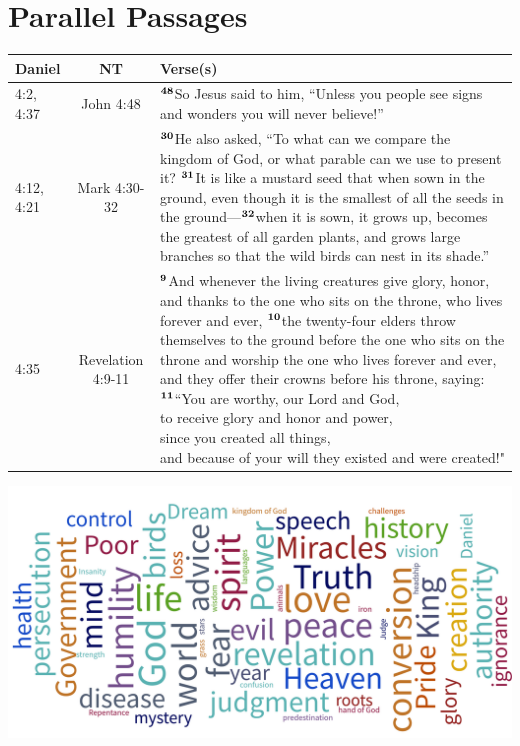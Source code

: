 \documentclass[12pt,a4paper,final]{article}
\renewcommand{\textsuperscript}[1]{\ensuremath{^{\textbf{\scriptsize #1}}}}
\begin{document}
\newpage
\section*{Parallel Passages}
\begin{tabularx}{\linewidth}{lcX}
\hline 
\textbf{Daniel} & \textbf{NT} & \textbf{Verse(s)} \\ 
\hline 
4:2, 4:37 & John 4:48 & \textsuperscript{48}So Jesus said to him, “Unless you people see signs and wonders you will never believe!” \\ 
\hline 
4:12, 4:21 & Mark 4:30-32 & \textsuperscript{30}He also asked, “To what can we compare the kingdom of God, or what parable can we use to present it? \textsuperscript{31}It is like a mustard seed that when sown in the ground, even though it is the smallest of all the seeds in the ground—\textsuperscript{32}when it is sown, it grows up, becomes the greatest of all garden plants, and grows large branches so that the wild birds can nest in its shade.”  \\ 
\hline 
4:35 & Revelation 4:9-11 & \makecell[Xt]{\textsuperscript{9}And whenever the living creatures give glory, honor, and thanks to the one who sits on the throne, who lives forever and ever, \textsuperscript{10}the twenty-four elders throw themselves to the ground before the one who sits on the throne and worship the one who lives forever and ever, and they offer their crowns before his throne, saying: \\
    \textsuperscript{11}“You are worthy, our Lord and God, \\
    to receive glory and honor and power, \\
    since you created all things, \\
    and because of your will they existed and were created!" \\ 
}\\
\hline 
\end{tabularx}

\includegraphics[width=\textwidth]{wordcloud.png} 
\end{document}
